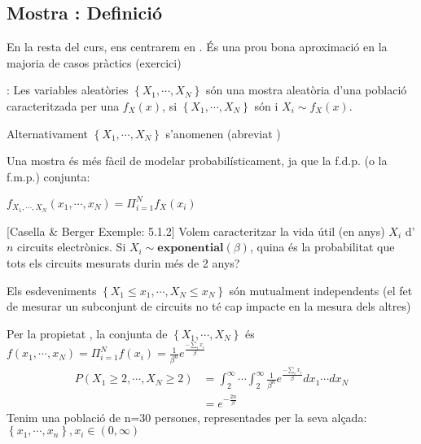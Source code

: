 \documentclass[letterpaper,10pt,english]{sphinxmanual}
\begin{document}
\subsection{Mostra : Definició}
\label{\detokenize{0_Intro/0_2_Intro_stats:mostra-iid-definicio}}
En la resta del curs, ens centrarem en . És una prou bona aproximació
en la majoria de casos pràctics (exercici)

: Les variables aleatòries \(\left\{X_1, \cdots, X_N\right\}\) són una mostra aleatòria d’una població
caracteritzada per una  \(f_X(x)\), si \(\left\{X_1, \cdots, X_N\right\}\) són  i \(X_i \sim f_X(x)\).

Alternativament \(\left\{X_1, \cdots, X_N\right\}\) s’anomenen  (abreviat )

Una mostra  és més fàcil de modelar probabilísticament, ja que la f.d.p. (o la f.m.p.) conjunta:

\(f_{X_1, \cdots, X_{N}}(x_1, \cdots, x_N) = \Pi_{i=1}^N f_X(x_i)\)

{[}Casella \& Berger Exemple: 5.1.2{]} Volem caracteritzar la vida útil (en anys) \(X_i\) d’\(n\) circuits electrònics. Si
\(X_i \sim \mathbf{exponential}\left(\beta\right)\), quina és la probabilitat que tots els circuits mesurats durin més de 2 anys?

Els esdeveniments \(\left\{X_1 \leq x_1, \cdots, X_{N} \leq x_{N}\right\}\) són mutualment independents (el fet de mesurar un subconjunt de circuits no té cap impacte en la mesura dels altres)

Per la propietat , la  conjunta de \(\left\{X_1, \cdots, X_{N}\right\}\) és \(f\left(x_1, \cdots, x_{N}\right) = \Pi_{i=1}^{N}f\left(x_i\right) = \frac{1}{\beta^n} e^{\frac{-\sum_i x_i}{\beta}}\)
\begin{equation*}
\begin{split}P\left(X_1 \geq 2, \cdots, X_N \geq 2\right) &= \int_{2}^{\infty}\cdots\int_{2}^{\infty}\frac{1}{\beta^n}e^{\frac{-\sum_i x_i}{\beta}} dx_1\cdots dx_N \\
                                             &= e^{-\frac{2n}{\beta}}\end{split}
\end{equation*}
Tenim una població de n=30 persones, representades per la seva alçada: \(\left\{x_1, \cdots, x_n\right\}, x_i\in \left(0, \infty\right)\)
\end{document}
